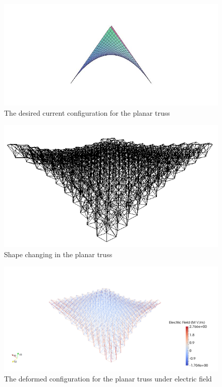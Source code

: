\begin{figure} 
\centering
\includegraphics[width=6.0in]{./chap_5_active_trusses/images_space_filler/xy_plane_desired_shape.jpg}
\caption{The desired current configuration for the planar truss}
\label{fig:xy_plane_desired_shape}
\end{figure}

\begin{figure} 
\centering
\includegraphics[width=4.5in]{./chap_5_active_trusses/images_space_filler/planar_truss_deformed_config_shape.png}
\caption{Shape changing in the planar truss} 
\label{fig:planar_truss_deformed_config}
\end{figure}


\begin{figure} 
\centering
\includegraphics[width=6.0in]{./chap_5_active_trusses/images_space_filler/planar_truss_deformed_efield_z_eq_xy.png}
\caption{The deformed configuration for the planar truss under electric field} 
\label{fig:planar_truss_deformed_config_efield}
\end{figure}

